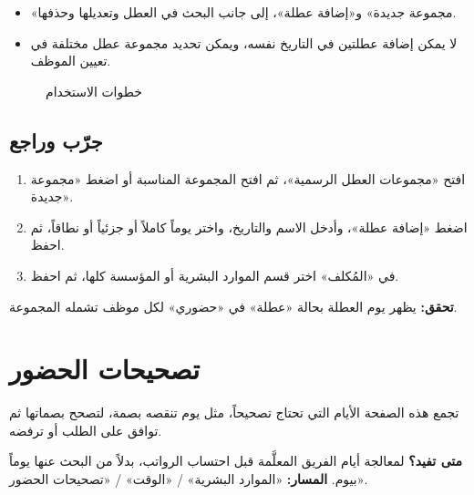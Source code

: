 \begin{itemize}
  \item «مجموعة جديدة» و«إضافة عطلة»، إلى جانب البحث في العطل وتعديلها وحذفها.
  \item لا يمكن إضافة عطلتين في التاريخ نفسه، ويمكن تحديد مجموعة عطل مختلفة في تعيين الموظف.
\end{itemize}

\begin{figure}[H]
\centering
{}
\rclegend
\caption{خطوات الاستخدام}
\label{fig:hr-feature-holiday-groups-flow}
\end{figure}

\subsection{جرّب وراجع}

\begin{enumerate}
  \item افتح «مجموعات العطل الرسمية»، ثم افتح المجموعة المناسبة أو اضغط «مجموعة جديدة».
  \item اضغط «إضافة عطلة»، وأدخل الاسم والتاريخ، واختر يوماً كاملاً أو جزئياً أو نطاقاً، ثم احفظ.
  \item في «المُكلف» اختر قسم الموارد البشرية أو المؤسسة كلها، ثم احفظ.
\end{enumerate}

\textbf{تحقق:} يظهر يوم العطلة بحالة «عطلة» في «حضوري» لكل موظف تشمله المجموعة.

\clearpage
\section{تصحيحات الحضور}
\label{sec:hr-feature-attendance-corrections}

تجمع هذه الصفحة الأيام التي تحتاج تصحيحاً، مثل يوم تنقصه بصمة، لتصحح بصماتها ثم توافق على الطلب أو ترفضه.

\textbf{متى تفيد؟} لمعالجة أيام الفريق المعلَّمة قبل احتساب الرواتب، بدلاً من البحث عنها يوماً بيوم. \textbf{المسار:} «الموارد البشرية» / «الوقت» / «تصحيحات الحضور».

